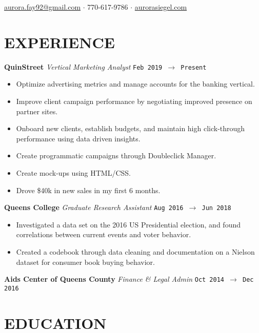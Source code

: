 \documentclass[margin, line, 11pt]{res}
\begin{document}
\noindent\hspace{-1.0in}{\LARGE\bf Aurora Siegel}
\hfill \href{mailto:aurora.fay92@gmail.com}{aurora.fay92@gmail.com}
$\cdot$ 770-617-9786
$\cdot$ \href{http://aurorasiegel.com}{aurorasiegel.com}

\begin{resume}

\section{EXPERIENCE}

{\bf QuinStreet}\vspace{0.04in} {\it Vertical Marketing Analyst} \hfill\texttt{Feb 2019 $\to$ Present}\vspace{0.04in}
\begin{itemize}
\item Optimize advertising metrics and manage accounts for the banking vertical.
\item Improve client campaign performance by negotiating improved presence on partner sites. 
\item Onboard new clients, establish budgets, and maintain high click-through performance using data driven insights.
\item Create programmatic campaigns through Doubleclick Manager.
\item Create mock-ups using HTML/CSS.
\item Drove \$40k in new sales in my first 6 months.
\end{itemize}

{\bf Queens College} {\it Graduate Research Assistant} \hfill\texttt{Aug 2016 $\to$ Jun 2018}\vspace{0.04in}
\begin{itemize}
\item Investigated a data set on the 2016 US Presidential election, and found correlations between current events and voter behavior. 
\item Created a codebook through data cleaning and documentation on a Nielson dataset for consumer book buying behavior.
\end{itemize}

{\bf Aids Center of Queens County} {\it Finance \& Legal Admin} \hfill\texttt{Oct 2014 $\to$ Dec 2016}\vspace{0.04in}

\section{EDUCATION}


\end{resume}
\end{document}
